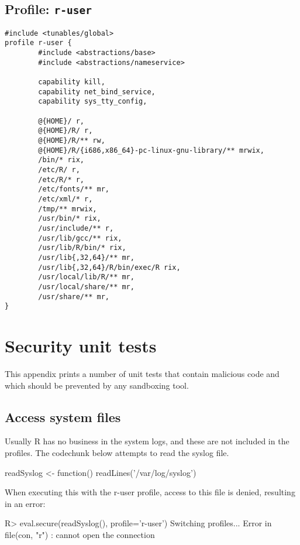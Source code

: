 \documentclass{jss}
\newcommand{\R}{\textsf{R}\xspace}
\begin{document}
\begin{appendices}
\subsection[Profile: r-user]{Profile: \texttt{r-user}}
\label{r-user}

\begin{verbatim}
#include <tunables/global>
profile r-user {
        #include <abstractions/base>
        #include <abstractions/nameservice>
	
        capability kill,
        capability net_bind_service,
        capability sys_tty_config,
	
        @{HOME}/ r,
        @{HOME}/R/ r,
        @{HOME}/R/** rw,
        @{HOME}/R/{i686,x86_64}-pc-linux-gnu-library/** mrwix,
        /bin/* rix,
        /etc/R/ r,
        /etc/R/* r,
        /etc/fonts/** mr,
        /etc/xml/* r,
        /tmp/** mrwix,
        /usr/bin/* rix,
        /usr/include/** r,
        /usr/lib/gcc/** rix,		
        /usr/lib/R/bin/* rix,
        /usr/lib{,32,64}/** mr,
        /usr/lib{,32,64}/R/bin/exec/R rix,
        /usr/local/lib/R/** mr,
        /usr/local/share/** mr,
        /usr/share/** mr,
}
\end{verbatim}



\section{Security unit tests}

This appendix prints a number of unit tests that contain malicious code and
which should be prevented by any sandboxing tool.

\subsection{Access system files}

Usually \R has no business in the system logs, and these are not included in
the profiles. The codechunk below attempts to read the syslog file.
\begin{CodeChunk}
\begin{CodeInput}
readSyslog <- function(){
	readLines('/var/log/syslog')
}
\end{CodeInput}
\end{CodeChunk}
When executing this with the r-user profile, access to this file is denied,
resulting in an error:
\begin{CodeChunk}
\begin{CodeInput}
R> eval.secure(readSyslog(), profile='r-user')
Switching profiles...
Error in file(con, "r") : cannot open the connection
\end{CodeInput}
\end{CodeChunk}


\end{appendices}
\end{document}
